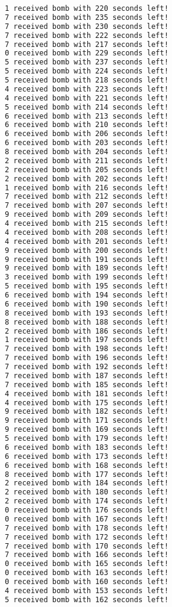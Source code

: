 \documentclass{article}
\begin{document}
\begin{lstlisting}[language=bash]
1 received bomb with 220 seconds left!
7 received bomb with 235 seconds left!
7 received bomb with 230 seconds left!
7 received bomb with 222 seconds left!
7 received bomb with 217 seconds left!
0 received bomb with 229 seconds left!
5 received bomb with 237 seconds left!
5 received bomb with 224 seconds left!
5 received bomb with 218 seconds left!
4 received bomb with 223 seconds left!
4 received bomb with 221 seconds left!
5 received bomb with 214 seconds left!
6 received bomb with 213 seconds left!
6 received bomb with 210 seconds left!
6 received bomb with 206 seconds left!
6 received bomb with 203 seconds left!
8 received bomb with 204 seconds left!
2 received bomb with 211 seconds left!
2 received bomb with 205 seconds left!
2 received bomb with 202 seconds left!
1 received bomb with 216 seconds left!
7 received bomb with 212 seconds left!
7 received bomb with 207 seconds left!
9 received bomb with 209 seconds left!
4 received bomb with 215 seconds left!
4 received bomb with 208 seconds left!
4 received bomb with 201 seconds left!
9 received bomb with 200 seconds left!
9 received bomb with 191 seconds left!
9 received bomb with 189 seconds left!
3 received bomb with 199 seconds left!
5 received bomb with 195 seconds left!
6 received bomb with 194 seconds left!
6 received bomb with 190 seconds left!
8 received bomb with 193 seconds left!
8 received bomb with 188 seconds left!
2 received bomb with 186 seconds left!
1 received bomb with 197 seconds left!
7 received bomb with 198 seconds left!
7 received bomb with 196 seconds left!
7 received bomb with 192 seconds left!
7 received bomb with 187 seconds left!
7 received bomb with 185 seconds left!
4 received bomb with 181 seconds left!
4 received bomb with 175 seconds left!
9 received bomb with 182 seconds left!
9 received bomb with 171 seconds left!
9 received bomb with 169 seconds left!
5 received bomb with 179 seconds left!
6 received bomb with 183 seconds left!
6 received bomb with 173 seconds left!
6 received bomb with 168 seconds left!
8 received bomb with 177 seconds left!
2 received bomb with 184 seconds left!
2 received bomb with 180 seconds left!
2 received bomb with 174 seconds left!
0 received bomb with 176 seconds left!
0 received bomb with 167 seconds left!
7 received bomb with 178 seconds left!
7 received bomb with 172 seconds left!
7 received bomb with 170 seconds left!
7 received bomb with 166 seconds left!
0 received bomb with 165 seconds left!
0 received bomb with 163 seconds left!
0 received bomb with 160 seconds left!
4 received bomb with 153 seconds left!
5 received bomb with 162 seconds left!

\end{lstlisting}
\end{document}
